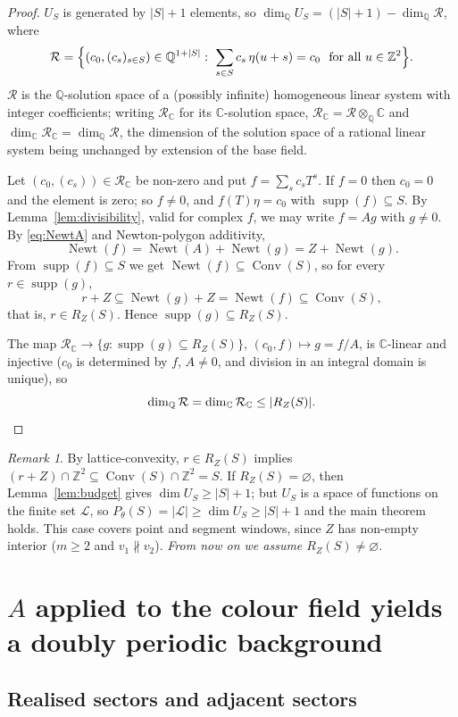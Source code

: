\documentclass[11pt,reqno]{amsart}
\theoremstyle{plain}
\theoremstyle{definition}
\theoremstyle{remark}
\newtheorem{rem}[thm]{Remark}
\theoremstyle{plain}
\theoremstyle{remark}
\theoremstyle{definition}
\numberwithin{equation}{section}
\DeclareMathOperator{\Conv}{Conv}
\DeclareMathOperator{\supp}{supp}
\DeclareMathOperator{\Newt}{Newt}
\newcommand{\Z}{\mathbb{Z}}
\newcommand{\C}{\mathbb{C}}
\newcommand{\Q}{\mathbb{Q}}
\newcommand{\cL}{\mathcal{L}}
\newcommand{\cR}{\mathcal{R}}
\begin{document}
\begin{proof}
$U_S$ is generated by $|S|+1$ elements, so
$\dim_{\Q}U_S=(|S|+1)-\dim_{\Q}\cR$, where
\[\cR=\Bigl\{(c_0,(c_s)_{s\in S})\in\Q^{1+|S|}:\
   \sum_{s\in S}c_s\,\eta(u+s)=c_0\ \text{ for all }u\in\Z^2\Bigr\}.\]
$\cR$ is the $\Q$-solution space of a (possibly infinite) homogeneous linear
system with integer coefficients; writing $\cR_{\C}$ for its $\C$-solution
space, $\cR_{\C}=\cR\otimes_{\Q}\C$ and
$\dim_{\C}\cR_{\C}=\dim_{\Q}\cR$, the dimension of the solution space of a
rational linear system being unchanged by extension of the base field.

Let $(c_0,(c_s))\in\cR_{\C}$ be non-zero and put $f=\sum_sc_sT^s$.  If $f=0$
then $c_0=0$ and the element is zero; so $f\ne0$, and $f(T)\eta=c_0$ with
$\supp(f)\subseteq S$.  By Lemma~\ref{lem:divisibility}, valid for complex $f$,
we may write $f=Ag$ with $g\ne0$.  By \eqref{eq:NewtA} and Newton-polygon
additivity,
\[\Newt(f)=\Newt(A)+\Newt(g)=Z+\Newt(g).\]
From $\supp(f)\subseteq S$ we get $\Newt(f)\subseteq\Conv(S)$, so for every
$r\in\supp(g)$,
\[r+Z\subseteq\Newt(g)+Z=\Newt(f)\subseteq\Conv(S),\]
that is, $r\in R_Z(S)$.  Hence $\supp(g)\subseteq R_Z(S)$.

The map $\cR_{\C}\to\{g:\supp(g)\subseteq R_Z(S)\}$, $(c_0,f)\mapsto g=f/A$, is
$\C$-linear and injective ($c_0$ is determined by $f$, $A\ne0$, and division in
an integral domain is unique), so
\[\dim_{\Q}\cR=\dim_{\C}\cR_{\C}\le|R_Z(S)| .\qedhere\]
\end{proof}

\begin{rem}\label{rem:empty-RZ}
By lattice-convexity, $r\in R_Z(S)$ implies
$(r+Z)\cap\Z^2\subseteq\Conv(S)\cap\Z^2=S$.  If $R_Z(S)=\varnothing$, then
Lemma~\ref{lem:budget} gives $\dim U_S\ge|S|+1$; but $U_S$ is a space of
functions on the finite set $\cL$, so
$P_\theta(S)=|\cL|\ge\dim U_S\ge|S|+1$ and the main theorem holds.  This case
covers point and segment windows, since $Z$ has non-empty interior ($m\ge2$ and
$v_1\not\parallel v_2$).  \emph{From now on we assume $R_Z(S)\ne\varnothing$.}
\end{rem}

\section{\texorpdfstring{$A$}{A} applied to the colour field yields a doubly
periodic background}\label{sec:background}

\setcounter{thm}{-1}
\subsection{Realised sectors and adjacent sectors}\label{ssec:sectors}
\end{document}

